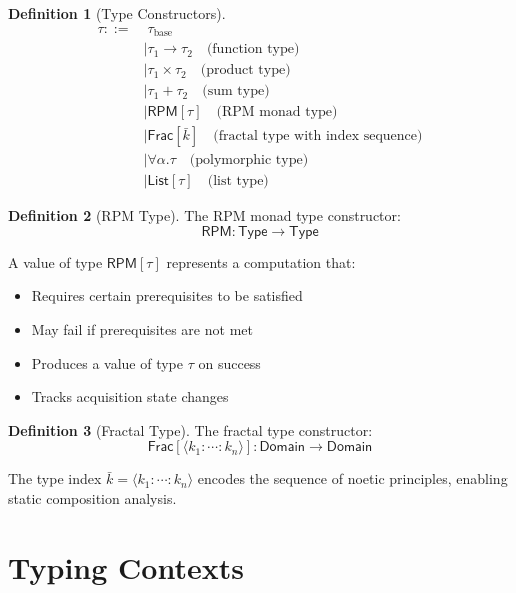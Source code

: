 \documentclass[11pt,twoside,openright]{book}
\theoremstyle{definition}
\newtheorem{definition}{Definition}[chapter]
\theoremstyle{plain}
\theoremstyle{remark}
\begin{document}
\begin{definition}[Type Constructors]
\label{def:type-constructors}
\begin{align}
\tau ::=&\; \tau_{\text{base}} \\
       &\mid \tau_1 \to \tau_2 \quad \text{(function type)} \\
       &\mid \tau_1 \times \tau_2 \quad \text{(product type)} \\
       &\mid \tau_1 + \tau_2 \quad \text{(sum type)} \\
       &\mid \mathsf{RPM}[\tau] \quad \text{(RPM monad type)} \\
       &\mid \mathsf{Frac}[\bar{k}] \quad \text{(fractal type with index sequence)} \\
       &\mid \forall \alpha. \tau \quad \text{(polymorphic type)} \\
       &\mid \mathsf{List}[\tau] \quad \text{(list type)}
\end{align}
\end{definition}

\begin{definition}[RPM Type]
\label{def:rpm-type-system}
The RPM monad type constructor:
\[
\mathsf{RPM} : \mathsf{Type} \to \mathsf{Type}
\]

A value of type $\mathsf{RPM}[\tau]$ represents a computation that:
\begin{itemize}
\item Requires certain prerequisites to be satisfied
\item May fail if prerequisites are not met
\item Produces a value of type $\tau$ on success
\item Tracks acquisition state changes
\end{itemize}
\end{definition}

\begin{definition}[Fractal Type]
\label{def:fractal-type-system}
The fractal type constructor:
\[
\mathsf{Frac}[\langle k_1 : \cdots : k_n \rangle] : \mathsf{Domain} \to \mathsf{Domain}
\]

The type index $\bar{k} = \langle k_1 : \cdots : k_n \rangle$ encodes the sequence of noetic principles, enabling static composition analysis.
\end{definition}

\section{Typing Contexts}
\end{document}
